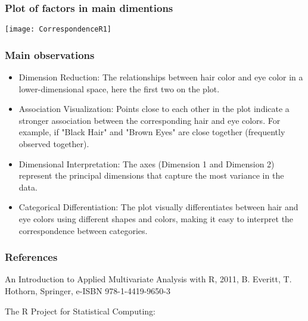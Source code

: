\documentclass[border=5mm, convert, usenames, dvipsnames,beamer]{standalone}
\begin{document}
\begin{frame}[ fragile]{}
\frametitle{Plot of factors in main dimentions}

\scriptsize
\vspace{40}


 \texttt{[image: CorrespondenceR1]}

\end{frame}




\begin{frame}[ fragile]{}
\frametitle{Main observations}

\vspace{40}
\begin{itemize}
\item Dimension Reduction: The relationships between hair color and eye color in a lower-dimensional space, here the first two on the plot.

\vspace{10}
\noindent
\item Association Visualization: Points close to each other in the plot indicate a stronger association between the corresponding hair and eye colors. For example, if "Black Hair" and "Brown Eyes" are close together (frequently observed together).

\vspace{10}
\noindent
\item Dimensional Interpretation: The axes (Dimension 1 and Dimension 2) represent the principal dimensions that capture the most variance in the data.


\vspace{10}
\noindent
\item Categorical Differentiation: The plot visually differentiates between hair and eye colors using different shapes and colors, making it easy to interpret the correspondence between categories.

\end{itemize}


\end{frame}




\begin{frame}[ fragile]{}
\frametitle{References}

\vspace{10}
\noindent
An Introduction to Applied Multivariate Analysis with R, 2011, B. Everitt, T. Hothorn, Springer, e-ISBN 978-1-4419-9650-3

\vspace{20}
\noindent
The R Project for Statistical Computing:

\noindent
{}

\end{frame}
\end{document}
